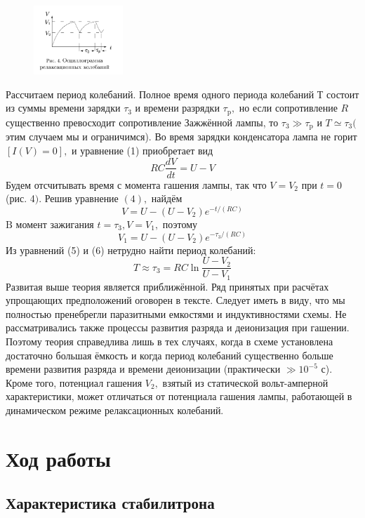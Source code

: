 \documentclass[a4paper, 12pt]{article}%
\begin{document}
\newpage

\begin{figure} 
\begin{center}
\includegraphics[width=0.3\textwidth]{./ann/4.PNG} 
\end{center}
\end{figure}

Рассчитаем период колебаний. Полное время одного периода колебаний Т состоит из суммы времени зарядки $\tau_{3}$ и времени разрядки $\tau_{\mathrm{p}},$ но если сопротивление $R$ существенно превосходит сопротивление Зажжённой лампы, то $\tau_{3} \gg \tau_{\mathrm{p}}$ и $T \simeq \tau_{3}($ этим случаем мы и ограничимся). Во время зарядки конденсатора лампа не горит $[I(V)=0],$ и уравнение (1) приобретает вид
$$
R C \frac{d V}{d t}=U-V
$$
Будем отсчитывать время с момента гашения лампы, так что $V=V_{2}$ при $t=0$ (рис. 4$) .$ Решив уравнение $(4),$ найдём
$$
V=U-\left(U-V_{2}\right) e^{-t /(R C)}
$$
$\mathrm{B}$ момент зажигания $t=\tau_{3}, V=V_{1},$ поэтому
$$
V_{1}=U-\left(U-V_{2}\right) e^{-\tau_{3} /(R C)}
$$
Из уравнений (5) и (6) нетрудно найти период колебаний:
$$
T \approx \tau_{3}=R C \ln \frac{U-V_{2}}{U-V_{1}}
$$
Развитая выше теория является приближённой. Ряд принятых при расчётах упрощающих предположений оговорен в тексте. Следует иметь в виду, что мы полностью пренебрегли паразитными емкостями и индуктивностями схемы. Не
рассматривались также процессы развития разряда и деионизация при гашении. Поэтому теория справедлива лишь в тех случаях, когда в схеме установлена достаточно большая ёмкость и когда период колебаний существенно больше времени развития разряда и времени деионизации (практически $\gg 10^{-5}$ с). Кроме того, потенциал гашения $V_{2},$ взятый из статической вольт-амперной характеристики, может отличаться от потенциала гашения лампы, работающей в динамическом режиме релаксационных колебаний.

\section{Ход работы}
\subsection{Характеристика стабилитрона}
\end{document}
